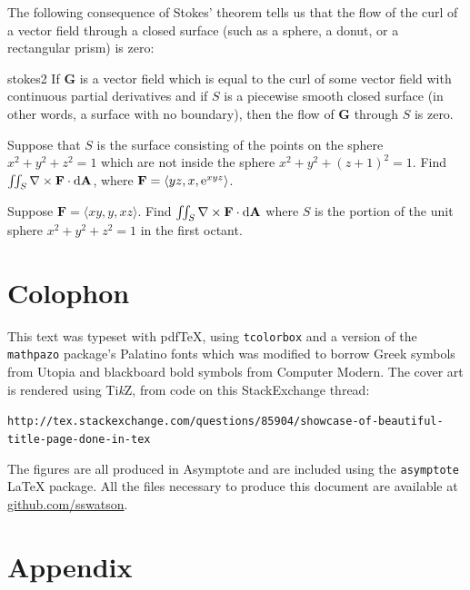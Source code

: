 \documentclass{watsonbook}
\begin{document}
The following consequence of Stokes' theorem tells us that the flow
of the curl of a vector field through a closed surface (such as a
sphere, a donut, or a rectangular prism) is zero:

\begin{obs}{}{stokes2}
  If $\mathbf{G}$ is a vector field which is equal to the curl of
  some vector field with continuous partial derivatives and if $S$
  is a piecewise smooth closed surface (in other words, a surface
  with no boundary), then the flow of $\mathbf{G}$ through $S$ is
  zero.
\end{obs}

\begin{exercise}{}{}
  Suppose that $S$ is the surface consisting of the points on the
  sphere $x^2 + y^2 + z^2 = 1$ which are not inside the sphere
  $x^2 + y^2 + (z+1)^2 = 1$. Find $\iint_{S} \nabla \times \mathbf{F}
  \cdot \mathrm{d}\mathbf{A}$, where $\mathbf{F} = \langle yz, x, \operatorname{e}^{xyz}
  \rangle$. 
\end{exercise}

\begin{exercise}{}{}
  Suppose $\mathbf{F} = \langle xy, y, xz \rangle$. Find
  $\iint_S \nabla \times \mathbf{F} \cdot \mathrm{d}\mathbf{A}$ where $S$ is
  the portion of the unit sphere $x^2 + y^2 + z^2 = 1$ in the first
  octant.
\end{exercise}

\chapter*{Colophon}

This text was typeset with pdf\TeX, using \texttt{tcolorbox} and a version of the
\texttt{mathpazo} package's Palatino fonts which was modified to borrow
Greek symbols from Utopia and blackboard bold symbols from Computer
Modern. The cover art is rendered using Ti\textit{k}Z, from code on
this StackExchange thread:

\texttt{http://tex.stackexchange.com/questions/85904/showcase-of-beautiful-title-page-done-in-tex}

The figures are all produced in Asymptote and are included using the
\texttt{asymptote} LaTeX package. All the files necessary to produce
this document are available at \url{github.com/sswatson}.

\appendix

\chapter{Appendix}
\end{document}
